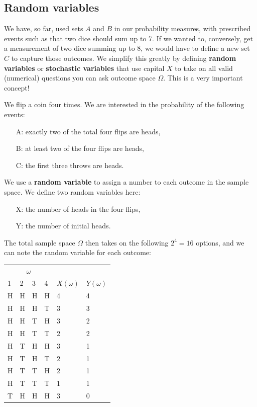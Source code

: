 \documentclass{article}
\begin{document}
\subsection{Random variables}
We have, so far, used sets $A$ and $B$ in our probability measures, with prescribed events such as that two dice should sum up to 7. If we wanted to, conversely, get a measurement of two dice summing up to 8, we would have to define a new set $C$ to capture those outcomes. We simplify this greatly by defining \textbf{random variables} or \textbf{stochastic variables} that use capital $X$ to take on all valid (numerical) questions you can ask outcome space $\Omega$. This is a very important concept!
\begin{testexample}
    We flip a coin four times. We are interested in the probability of the following events:
    \begin{enumerate}
        \item[A:]  exactly two of the total four flips are heads,
        \item[B:] at least two of the four flips are heads,
        \item[C:] the first three throws are heads.
    \end{enumerate}
    We use a \textbf{random variable} to assign a number to each outcome in the sample space. We define two random variables here:
    \begin{enumerate}
        \item[X:] the number of heads in the four flips,
        \item[Y:] the number of initial heads.
    \end{enumerate}
    The total sample space $\Omega$ then takes on the following $2^4=16$ options, and we can note the random variable for each outcome:
\begin{center}
    \begin{tabular}{@{}llll|ll}
\toprule
\multicolumn{4}{c|}{$\omega$}\\
1&2&3&4 & $X(\omega)$ & $Y(\omega)$ \\ \hline
H&H&H&H&4&4\\
H&H&H&T&3&3\\
H&H&T&H&3&2\\
H&H&T&T&2&2\\
H&T&H&H&3&1\\
H&T&H&T&2&1\\
H&T&T&H&2&1\\
H&T&T&T&1&1\\
T&H&H&H&3&0\\

\end{tabular}
\end{center}
\end{testexample}
\end{document}

